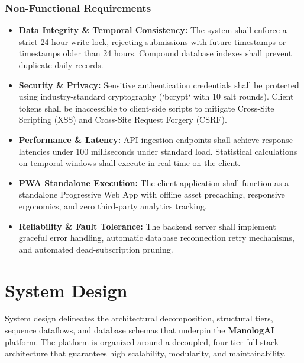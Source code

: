 \subsection{Non-Functional Requirements}
\begin{itemize}
  \item \textbf{Data Integrity \& Temporal Consistency:} The system shall enforce a strict 24-hour write lock, rejecting submissions with future timestamps or timestamps older than 24 hours. Compound database indexes shall prevent duplicate daily records.
  \item \textbf{Security \& Privacy:} Sensitive authentication credentials shall be protected using industry-standard cryptography (`bcrypt` with 10 salt rounds). Client tokens shall be inaccessible to client-side scripts to mitigate Cross-Site Scripting (XSS) and Cross-Site Request Forgery (CSRF).
  \item \textbf{Performance \& Latency:} API ingestion endpoints shall achieve response latencies under 100 milliseconds under standard load. Statistical calculations on temporal windows shall execute in real time on the client.
  \item \textbf{PWA Standalone Execution:} The client application shall function as a standalone Progressive Web App with offline asset precaching, responsive ergonomics, and zero third-party analytics tracking.
  \item \textbf{Reliability \& Fault Tolerance:} The backend server shall implement graceful error handling, automatic database reconnection retry mechanisms, and automated dead-subscription pruning.
\end{itemize}


\chapter{System Design}
\label{Chapter4}

System design delineates the architectural decomposition, structural tiers, sequence dataflows, and database schemas that underpin the \textbf{ManologAI} platform. The platform is organized around a decoupled, four-tier full-stack architecture that guarantees high scalability, modularity, and maintainability.

